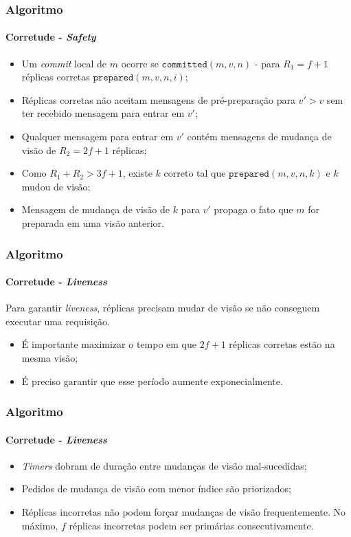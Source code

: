 \documentclass{beamer}
\begin{document}
\begin{frame}
  \frametitle{Algoritmo}
  \framesubtitle{Corretude - \textit{Safety}}

  \begin{itemize}
    \item
      Um \textit{commit} local de $m$ ocorre se $\texttt{committed}(m, v, n)$ - para $R_1 = f + 1$ réplicas corretas $\texttt{prepared}(m, v, n, i)$;

    \item
      Réplicas corretas não aceitam mensagens de pré-preparação para $v' > v$ sem ter recebido mensagem para entrar em $v'$;

    \item
      Qualquer mensagem para entrar em $v'$ contém mensagens de mudança de visão de $R_2 = 2f + 1$ réplicas;

    \item
      Como $R_1 + R_2 > 3f + 1$, existe $k$ correto tal que $\texttt{prepared}(m, v, n, k)$ e $k$ mudou de visão;

    \item
      Mensagem de mudança de visão de $k$ para $v'$ propaga o fato que $m$ for preparada em uma visão anterior.
  \end{itemize}
\end{frame}

\begin{frame}
  \frametitle{Algoritmo}
  \framesubtitle{Corretude - \textit{Liveness}}

  Para garantir \textit{liveness}, réplicas precisam mudar de visão se não conseguem executar uma requisição.
  \begin{itemize}
    \item
      É importante maximizar o tempo em que $2f + 1$ réplicas corretas estão na mesma visão;
      
    \item
      É preciso garantir que esse período aumente exponecialmente.
  \end{itemize}
\end{frame}

\begin{frame}
  \frametitle{Algoritmo}
  \framesubtitle{Corretude - \textit{Liveness}}

  \begin{itemize}
    \item
      \textit{Timers} dobram de duração entre mudanças de visão mal-sucedidas;

    \item
      Pedidos de mudança de visão com menor índice são priorizados;

    \item
      Réplicas incorretas não podem forçar mudanças de visão frequentemente. No máximo, $f$ réplicas incorretas podem ser primárias consecutivamente.
  \end{itemize}

\end{frame}
\end{document}
